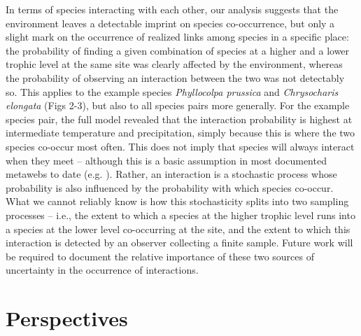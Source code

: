 \documentclass[12pt]{article}
\begin{document}
In terms of species interacting with each other, our analysis suggests that the
environment leaves a detectable imprint on species co-occurrence, but only a
slight mark on the occurrence of realized links among species in a specific
place: the probability of finding a given combination of species at a higher
and a lower trophic level at the same site was clearly affected by the
environment, whereas the probability of observing an interaction between the
two was not detectably so. This applies to the example species \textit{Phyllocolpa
prussica} and \textit{Chrysocharis elongata} (Figs 2-3), but also to all species pairs
more generally. For the example species pair, the full model revealed that the
interaction probability is highest at intermediate temperature and
precipitation, simply because this is where the two species co-occur most
often. This does not imply that species will always interact when they meet –
although this is a basic assumption in most documented metawebs to date (e.g.
\citealt{Havens1992, Wood2015}). Rather, an interaction is a stochastic process whose
probability is also influenced by the probability with which species co-occur.
What we cannot reliably know is how this stochasticity splits into two
sampling processes – i.e., the extent to which a species at the higher trophic
level runs into a species at the lower level co-occurring at the site, and the
extent to which this interaction is detected by an observer collecting a
finite sample. Future work will be required to document the relative
importance of these two sources of uncertainty in the occurrence of
interactions.

\section*{Perspectives}
\end{document}

